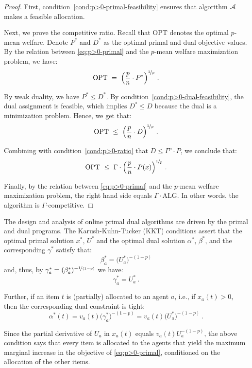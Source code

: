 \documentclass[11pt,letterpaper]{article}
\newcommand{\OPT}{\mathrm{OPT}}
\newcommand{\ALG}{\mathrm{ALG}}
\newcommand{\A}{\mathcal{A}}
\newcommand{\utility}{U}
\begin{document}
\begin{proof}
	First, condition~\ref{cond:p>0-primal-feasibility} ensures that algorithm $\A$ makes a feasible allocation.
	
	Next, we prove the competitive ratio.
	Recall that $\OPT$ denotes the optimal $p$-mean welfare.
	Denote $P^*$ and $D^*$ as the optimal primal and dual objective values.
	By the relation between \ref{eq:p>0-primal} and the $p$-mean welfare maximization problem, we have:
	\[
		\OPT ~=~ \Big(\frac{p}{n} \cdot P^*\Big)^{\nicefrac{1}{p}} 
		~.
	\]
	
	By weak duality, we have $P^* \le D^*$. 
	By condition~\ref{cond:p>0-dual-feasibility}, the dual assignment is feasible, which implies $D^* \leq D$ because the dual is a minimization problem.
    Hence, we get that:
    \[
    	\OPT 
        ~\leq~ 
        \Big(\frac{p}{n} \cdot D\Big)^{\nicefrac{1}{p}} 
        ~.
    \]
    
    Combining with condition~\ref{cond:p>0-ratio} that $D \le \Gamma^p \cdot P$, we conclude that:
	\begin{equation*}
        \OPT 
        ~\leq~ 
        \Gamma \cdot \Big(\frac{p}{n} \cdot P(x)\Big)^{\nicefrac{1}{p}}
        ~.
	\end{equation*}
	
	Finally, by the relation between \ref{eq:p>0-primal} and the $p$-mean welfare maximization problem, the right hand side equals $\Gamma \cdot \ALG$.
	In other words, the algorithm is $\Gamma$-competitive.
\end{proof}
	
The design and analysis of online primal dual algorithms are driven by the primal and dual programs.
The Karush-Kuhn-Tucker (KKT) conditions assert that the optimal primal solution $x^*$, $\utility^*$ and the optimal dual solution $\alpha^*$, $\beta^*$, and the corresponding $\gamma^*$ satisfy that:
\[
	\beta_a^* = \big( \utility_a^* \big)^{-(1-p)}
\]
and, thus, by $\gamma_a^* = (\beta_a^*)^{-\nicefrac{1}{(1-p)}}$ we have:
\[
	\gamma_a^* = \utility_a^*
	~.
\]

Further, if an item $t$ is (partially) allocated to an agent $a$, i.e., if $x_a(t) > 0$, then the corresponding dual constraint is tight:
\[
	\alpha^*(t) = v_a(t) \big(\gamma_a^*\big)^{-(1-p)} = v_a(t) \big(\utility_a^*\big)^{-(1-p)}
	~.
\]

Since the partial derivative of $U_a$ in $x_a(t)$ equals $v_a(t) U_a^{-(1-p)}$, the above condition says that every item is allocated to the agents that yield the maximum marginal increase in the objective of \ref{eq:p>0-primal}, conditioned on the allocation of the other items.	
\end{document}
